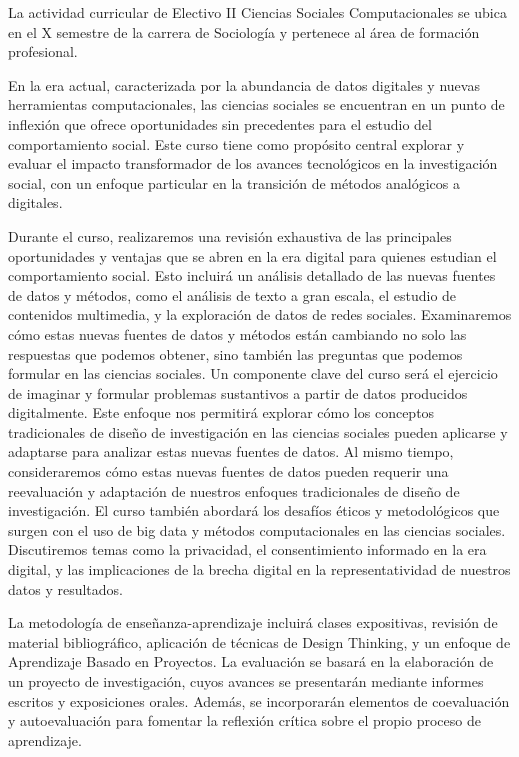 \documentclass[11pt,letter,]{article}
\begin{document}
La actividad curricular de Electivo II Ciencias Sociales Computacionales
se ubica en el X semestre de la carrera de Sociología y pertenece al
área de formación profesional.

En la era actual, caracterizada por la abundancia de datos digitales y
nuevas herramientas computacionales, las ciencias sociales se encuentran
en un punto de inflexión que ofrece oportunidades sin precedentes para
el estudio del comportamiento social. Este curso tiene como propósito
central explorar y evaluar el impacto transformador de los avances
tecnológicos en la investigación social, con un enfoque particular en la
transición de métodos analógicos a digitales.

Durante el curso, realizaremos una revisión exhaustiva de las
principales oportunidades y ventajas que se abren en la era digital para
quienes estudian el comportamiento social. Esto incluirá un análisis
detallado de las nuevas fuentes de datos y métodos, como el análisis de
texto a gran escala, el estudio de contenidos multimedia, y la
exploración de datos de redes sociales. Examinaremos cómo estas nuevas
fuentes de datos y métodos están cambiando no solo las respuestas que
podemos obtener, sino también las preguntas que podemos formular en las
ciencias sociales. Un componente clave del curso será el ejercicio de
imaginar y formular problemas sustantivos a partir de datos producidos
digitalmente. Este enfoque nos permitirá explorar cómo los conceptos
tradicionales de diseño de investigación en las ciencias sociales pueden
aplicarse y adaptarse para analizar estas nuevas fuentes de datos. Al
mismo tiempo, consideraremos cómo estas nuevas fuentes de datos pueden
requerir una reevaluación y adaptación de nuestros enfoques
tradicionales de diseño de investigación. El curso también abordará los
desafíos éticos y metodológicos que surgen con el uso de big data y
métodos computacionales en las ciencias sociales. Discutiremos temas
como la privacidad, el consentimiento informado en la era digital, y las
implicaciones de la brecha digital en la representatividad de nuestros
datos y resultados.

La metodología de enseñanza-aprendizaje incluirá clases expositivas,
revisión de material bibliográfico, aplicación de técnicas de Design
Thinking, y un enfoque de Aprendizaje Basado en Proyectos. La evaluación
se basará en la elaboración de un proyecto de investigación, cuyos
avances se presentarán mediante informes escritos y exposiciones orales.
Además, se incorporarán elementos de coevaluación y autoevaluación para
fomentar la reflexión crítica sobre el propio proceso de aprendizaje.
\end{document}
